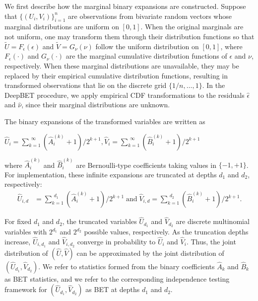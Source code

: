 \documentclass[12pt,reqno,oneside]{amsbook}
\theoremstyle{definition}
\theoremstyle{remark}
\begin{document}



\hspace{0.5cm}
We first describe how the marginal binary expansions are constructed. Suppose that
$\{(U_i,V_i)\}_{i=1}^{n}$ are observations from bivariate random vectors whose marginal distributions are uniform on $[0,1]$. When the original marginals are not uniform, one may transform them through their distribution functions so that
$\tilde{U}=F_\epsilon(\epsilon)$ and $\tilde{V}=G_\nu(\nu)$
follow the uniform distribution on $[0,1]$, where
$F_\epsilon(\cdot)$ and $G_\nu(\cdot)$ are the marginal cumulative distribution functions of $\epsilon$ and $\nu$, respectively. When these marginal distributions are unavailable, they may be replaced by their empirical cumulative distribution functions, resulting in transformed observations that lie on the discrete grid
$\{1/n,\ldots,1\}$. In the DeepBET procedure, we apply empirical CDF transformations to the residuals $\hat{\epsilon}$ and $\hat{\nu}$, since their marginal distributions are unknown.

\hspace{0.5cm}
The binary expansions of the transformed variables are written as
\begin{center}
  $\hat{U}_i= \sum_{k=1}^{\substack{\infty}}(\hat{A}_i^{(k)}+1)/{{2}^{k+1}},  \hat{V}_i = \sum_{k=1}^{\substack{\infty}}(\hat{B}_i^{(k)}+1)/{{2}^{k+1}}$
\end{center}
where $\hat{A}_i^{(k)}$ and $\hat{B}_i^{(k)}$ are Bernoulli-type coefficients taking values in $\{-1,+1\}$. For implementation, these infinite expansions are truncated at depths $d_1$ and $d_2$, respectively:
\begin{align*}
   \hat{U}_{i,d}\!&=\!\sum_{k=1}^{\substack{d_1}}(\hat{A}_i^{(k)}\!+\!1)/{{2}^{k+1}}\;\mbox{and}\; 
   \hat{V}_{i,d}\!=\!\sum_{k=1}^{\substack{d_2}}(\hat{B}_i^{(k)}\!+\!1)/{{2}^{k+1}}.
\end{align*}

For fixed $d_1$ and $d_2$, the truncated variables $\hat{U}_{d_1}$ and $\hat{V}_{d_2}$ are discrete multinomial variables with $2^{d_1}$ and $2^{d_2}$ possible values, respectively. As the truncation depths increase, $\hat{U}_{i,d_1}$ and $\hat{V}_{i,d_2}$ converge in probability to $\hat{U}_i$ and $\hat{V}_i$. Thus, the joint distribution of $(\hat{U},\hat{V})$ can be approximated by the joint distribution of $(\hat{U}_{d_1},\hat{V}_{d_2})$. We refer to statistics formed from the binary coefficients $\hat{A}_{k}$ and $\hat{B}_{k}$ as BET statistics, and we refer to the corresponding independence testing framework for $(\hat{U}_{d_1},\hat{V}_{d_2})$ as BET at depths $d_1$ and $d_2$.
\end{document}
